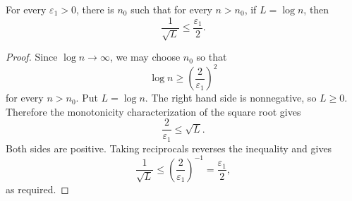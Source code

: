 \begin{helper}
For every \(\varepsilon_1>0\), there is \(n_0\) such that for every
\(n>n_0\), if \(L=\log n\), then
\[
\frac1{\sqrt L}\le \frac{\varepsilon_1}{2}.
\]
\end{helper}
\begin{proof}
Since \(\log n\to\infty\), we may choose \(n_0\) so that
\[
\log n\ge \left(\frac2{\varepsilon_1}\right)^2
\]
for every \(n>n_0\).  Put \(L=\log n\).  The right hand side is
nonnegative, so \(L\ge0\).  Therefore the monotonicity characterization of
the square root gives
\[
\frac2{\varepsilon_1}\le \sqrt L.
\]
Both sides are positive.  Taking reciprocals reverses the inequality and
gives
\[
\frac1{\sqrt L}\le \left(\frac2{\varepsilon_1}\right)^{-1}
=\frac{\varepsilon_1}{2},
\]
as required.
\end{proof}
